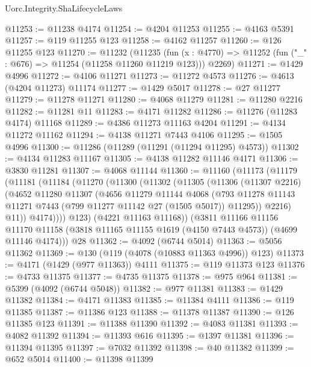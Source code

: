 \begin{lexlean}{Uorc.Integrity.ShaLifecycleLaws}
\begin{coremodule}
@11253 := @11238 @4174
@11254 := @4204 @11253
@11255 := @4163 @5391
@11257 := @119 @11255 @123
@11258 := @4162 @11257
@11260 := @126 @11255 @123
@11270 := @11232
    (@11235
      (fun (x : @4770) => @11252 (fun ("_" : @676) => @11254 (@11258 @11260 @11219 @123)))
      @2269)
@11271 := @1429 @4996
@11272 := @4106 @11271
@11273 := @11272 @4573
@11276 := @4613 (@4204 @11273) @11174
@11277 := @1429 @5017
@11278 := @27 @11277
@11279 := @11278 @11271
@11280 := @4068 @11279
@11281 := @11280 @2216
@11282 := @11281 @11
@11283 := @4171 @11282
@11286 := @11276 (@11283 @4174) @11168
@11289 := @4386 @11273 @11163 @4204
@11291 := @4134 @11272 @11162
@11294 := @4138 @11271 @7443 @4106
@11295 := @1505 @4996
@11300 := @11286 (@11289 (@11291 (@11294 @11295) @4573))
@11302 := @4134 @11283 @11167
@11305 := @4138 @11282 @11146 @4171
@11306 := @3830 @11281
@11307 := @4068 @11144
@11360 := @11160
    (@11173
      (@11179
        (@11181
          (@11184
            (@11270
              (@11300
                (@11302
                  (@11305
                    (@11306
                      (@11307 @2216)
                      (@4652
                        @11280
                        @11307
                        (@4656
                          @11279
                          @11144
                          @4068
                          (@793
                            @11278
                            @11143
                            @11271
                            @7443
                            (@799 @11277 @11142 @27 (@1505 @5017))
                            @11295))
                        @2216)
                      @11))
                  @4174))))
          @123)
        (@4221 @11163 @11168))
      (@3811
        @11166
        @11156
        @11170
        @11158
        (@3818 @11165 @11155 @1619 (@4150 @7443 @4573))
        (@4699 @11146 @4174)))
    @28
@11362 := @4092 (@6744 @5014)
@11363 := @5056 @11362
@11369 := @130 (@119 (@4078 (@10883 @11363 @4996)) @123)
@11373 := @4171 (@1429 (@977 @11363)) @4111
@11375 := @119 @11373 @123
@11376 := @4733 @11375
@11377 := @4735 @11375
@11378 := @975 @964
@11381 := @5399 (@4092 (@6744 @5048))
@11382 := @977 @11381
@11383 := @1429 @11382
@11384 := @4171 @11383
@11385 := @11384 @4111
@11386 := @119 @11385
@11387 := @11386 @123
@11388 := @11378 @11387
@11390 := @126 @11385 @123
@11391 := @11388 @11390
@11392 := @4083 @11381
@11393 := @4082 @11392
@11394 := @11393 @616
@11395 := @1397 @11381
@11396 := @11394 @11395
@11397 := @7032 @11392
@11398 := @40 @11382
@11399 := @652 @5014
@11400 := @11398 @11399

\end{coremodule}
\end{lexlean}
